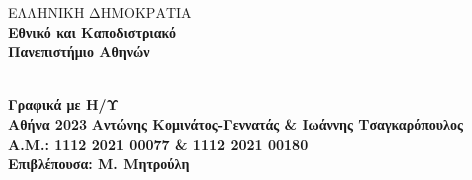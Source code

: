 \begin{titlepage}
		\begin{center}
			\begin{minipage}{0.15\textwidth}
			\end{minipage}
			\begin{minipage}{0.40\textwidth}
				\centering
				ΕΛΛΗΝΙΚΗ ΔΗΜΟΚΡΑΤΙΑ\\
				\large{\textbf{Εθνικό και Καποδιστριακό\\Πανεπιστήμιο Αθηνών}}\\[2mm]
			\end{minipage}
			\hRule
			\vspace{10pt}
			\\
			\Large{\textbf{Γραφικά με Η/Υ}} \\[4mm]
			\large{\textbf{Αθήνα 2023}}
			\vfill
			\normalsize{\textbf{Αντώνης Κομινάτος-Γεννατάς \&  Ιωάννης Τσαγκαρόπουλος }}\\[4mm]
			\normalsize{\textbf{Α.Μ.: 1112 2021 00077 \& 1112 2021 00180}}\\[6mm]
			\small{\textbf{Επιβλέπουσα: Μ. Μητρούλη}}
		\end{center}
	\end{titlepage}